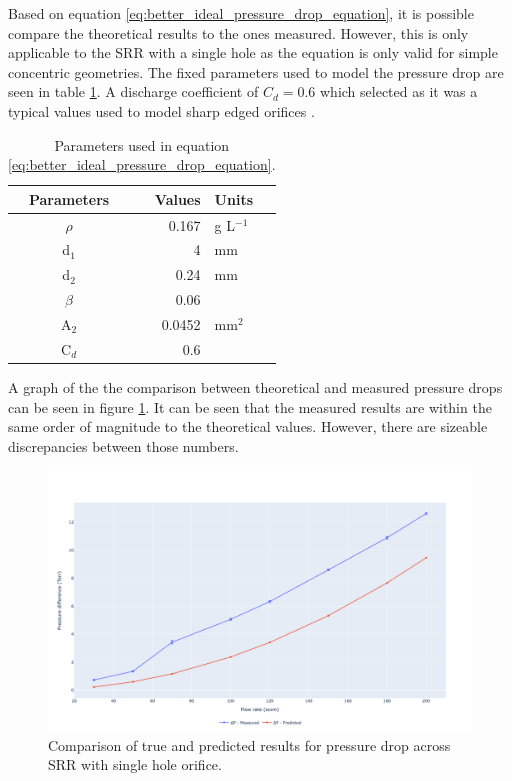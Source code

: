 Based on equation \ref{eq:better_ideal_pressure_drop_equation}, it is possible compare the theoretical results to the ones measured. However, this is only applicable to the SRR with a single hole as the equation is only valid for simple concentric geometries. The fixed parameters used to model the pressure drop are seen in table \ref{tb:params_for_pressure_drop_results}. A discharge coefficient of $C_d = 0.6$ which selected as it was a typical values used to model sharp edged orifices \cite{EdgarONTO, Woodward2014}. 

\begin{table}[h!]
\centering
\caption{Parameters used in equation \ref{eq:better_ideal_pressure_drop_equation}.}
\begin{tabular}{crl}
Parameters & Values & Units \\
\hline
$\rho$     & 0.167  & g L$^{-1}$ \\
d$_1$      & 4      & mm         \\
d$_2$      & 0.24   & mm         \\
$\beta$    & 0.06   &            \\
A$_2$      & 0.0452 & mm$^2$     \\
C$_d$      & 0.6    &      
\end{tabular}
\label{tb:params_for_pressure_drop_results}
\end{table}

A graph of the the comparison between theoretical and measured pressure drops can be seen in figure \ref{fig:pressure_difference}. It can be seen that the measured results are within the same order of magnitude to the theoretical values. However, there are sizeable discrepancies between those numbers. 

\begin{figure}[h!]
	\centering
	\includegraphics[width=\linewidth]{chapter_4/figures/pressure_difference.png}
	\caption{Comparison of true and predicted results for pressure drop across SRR with single hole orifice.}
	\label{fig:pressure_difference}
\end{figure}

